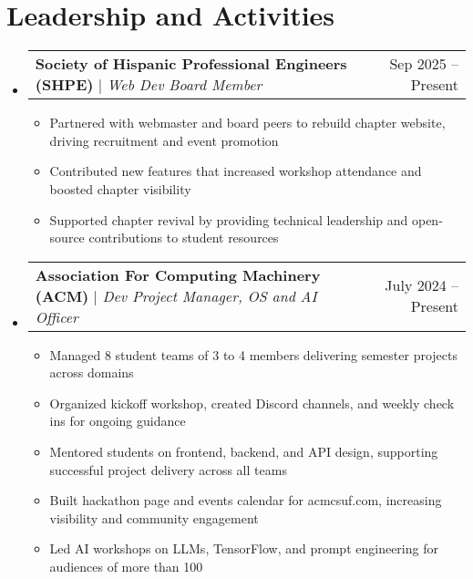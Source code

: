 \documentclass[letterpaper,11pt]{article}
\makeatletter
\newcommand{\resumeItem}[1]{
  \item\small{
    {#1 \vspace{-2pt}}
  }
}
\newcommand{\resumeProjectHeading}[2]{
    \item
    \begin{tabular*}{0.97\textwidth}{l@{\extracolsep{\fill}}r}
      \small#1 & #2 \\
    \end{tabular*}\vspace{-7pt}
}
\newcommand{\resumeSubHeadingListStart}{\begin{itemize}[leftmargin=0.15in, label={}]}
\newcommand{\resumeSubHeadingListEnd}{\end{itemize}}
\newcommand{\resumeItemListStart}{\begin{itemize}}
\newcommand{\resumeItemListEnd}{\end{itemize}\vspace{-5pt}}
\makeatother
\begin{document}
\section{Leadership and Activities}
    \resumeSubHeadingListStart
    \resumeProjectHeading
          {\textbf{Society of Hispanic Professional Engineers (SHPE)} $|$ \emph{Web Dev Board Member}}{Sep 2025 -- Present}
          \resumeItemListStart
            \resumeItem{Partnered with webmaster and board peers to rebuild chapter website, driving recruitment and event promotion}
            \resumeItem{Contributed new features that increased workshop attendance and boosted chapter visibility}
            \resumeItem{Supported chapter revival by providing technical leadership and open-source contributions to student resources}
          \resumeItemListEnd
          \resumeProjectHeading
          {\textbf{Association For Computing Machinery (ACM)} $|$ \emph{Dev Project Manager, OS and AI Officer}}{July 2024 -- Present}
          \resumeItemListStart
            \resumeItem{Managed 8 student teams of 3 to 4 members delivering semester projects across domains}
            \resumeItem{Organized kickoff workshop, created Discord channels, and weekly check ins for ongoing guidance}
            \resumeItem{Mentored students on frontend, backend, and API design, supporting successful project delivery across all teams}
            \resumeItem{Built hackathon page and events calendar for acmcsuf.com, increasing visibility and community engagement}
            \resumeItem{Led AI workshops on LLMs, TensorFlow, and prompt engineering for audiences of more than 100}
          \resumeItemListEnd
    \resumeSubHeadingListEnd



%

\end{document}
